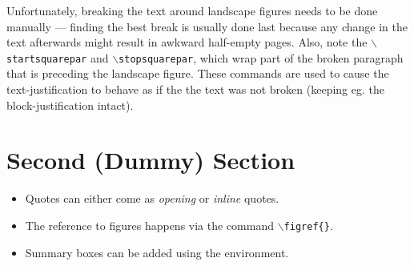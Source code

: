 \begin{multicols}{2}
Unfortunately, breaking the text around landscape figures needs to be done manually --- finding the best break is usually done last because any change in the text afterwards might result in awkward half-empty pages.
Also, note the \texttt{$\backslash$startsquarepar} and \texttt{$\backslash$stopsquarepar}, which wrap part of the broken paragraph that is preceding the landscape figure.
These commands are used to cause the text-justification to behave as if the the text was not broken (keeping eg. the block-justification intact).

\section{Second (Dummy) Section}
\textcolor{black!35}{\lipsum[1]}

\begin{tcolorbox}[arc=0pt,outer arc=0pt,breakable,title = Summary,
colback=clrt2!30,colframe=clrt2,pad at break=3mm,boxrule=1pt]
   \begin{itemize}[leftmargin=1em]
   \setlength{\itemsep}{0em}
    \item{Quotes can either come as \textit{opening} or \textit{inline} quotes.}
    \item{The reference to figures happens via the command \texttt{$\backslash$figref\{\}}.}
    \item{Summary boxes can be added using the  environment.}
\end{itemize}
\end{tcolorbox}

\end{multicols}
